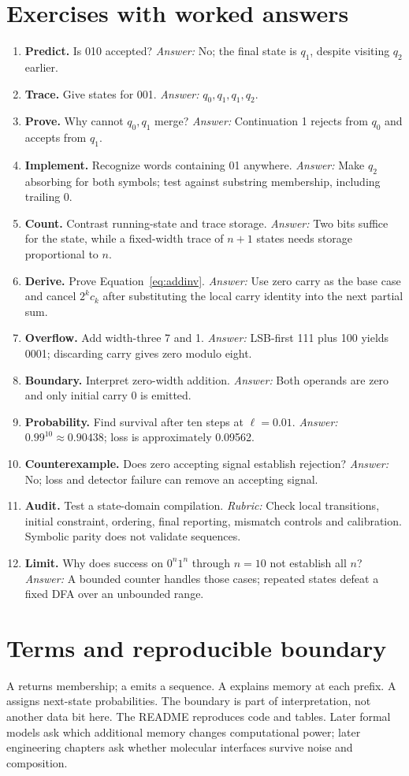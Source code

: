 \section{Exercises with worked answers}
\begin{enumerate}
\item \textbf{Predict.} Is 010 accepted? \emph{Answer:} No; the final state is
$q_1$, despite visiting $q_2$ earlier.
\item \textbf{Trace.} Give states for 001. \emph{Answer:} $q_0,q_1,q_1,q_2$.
\item \textbf{Prove.} Why cannot $q_0,q_1$ merge?
\emph{Answer:} Continuation 1 rejects from $q_0$ and accepts from $q_1$.
\item \textbf{Implement.} Recognize words containing 01 anywhere.
\emph{Answer:} Make $q_2$ absorbing for both symbols; test against substring
membership, including trailing 0.
\item \textbf{Count.} Contrast running-state and trace storage.
\emph{Answer:} Two bits suffice for the state, while a fixed-width trace of
$n+1$ states needs storage proportional to $n$.
\item \textbf{Derive.} Prove Equation~\ref{eq:addinv}.
\emph{Answer:} Use zero carry as the base case and cancel $2^kc_k$ after
substituting the local carry identity into the next partial sum.
\item \textbf{Overflow.} Add width-three 7 and 1.
\emph{Answer:} LSB-first 111 plus 100 yields 0001; discarding carry gives zero modulo eight.
\item \textbf{Boundary.} Interpret zero-width addition.
\emph{Answer:} Both operands are zero and only initial carry 0 is emitted.
\item \textbf{Probability.} Find survival after ten steps at $\ell=0.01$.
\emph{Answer:} $0.99^{10}\approx0.90438$; loss is approximately 0.09562.
\item \textbf{Counterexample.} Does zero accepting signal establish rejection?
\emph{Answer:} No; loss and detector failure can remove an accepting signal.
\item \textbf{Audit.} Test a state-domain compilation.
\emph{Rubric:} Check local transitions, initial constraint, ordering, final reporting,
mismatch controls and calibration. Symbolic parity does not validate sequences.
\item \textbf{Limit.} Why does success on $0^n1^n$ through $n=10$ not establish
all $n$? \emph{Answer:} A bounded counter handles those cases; repeated states
defeat a fixed DFA over an unbounded range.
\end{enumerate}
\section{Terms and reproducible boundary}
A  returns membership; a  emits a sequence.
A  explains memory at each prefix.
A  assigns next-state probabilities.
The  boundary is part of interpretation, not another data bit here.
The README reproduces code and tables. Later formal models ask which additional
memory changes computational power; later engineering chapters ask whether
molecular interfaces survive noise and composition.
